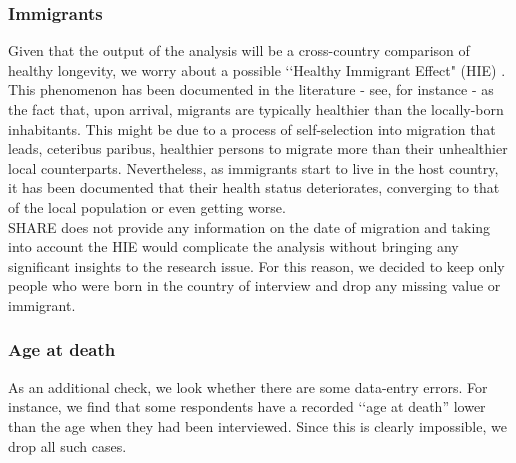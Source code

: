 \subsubsection{Immigrants}
Given that the output of the analysis will be a cross-country comparison of healthy longevity, we worry about a possible \lq\lq Healthy Immigrant Effect" (HIE) . This phenomenon has been documented in the literature - see, for instance \cite{Deri2004UnderstandingCanada, Kennedy2006TheCountries} - as the fact that, upon  arrival, migrants are typically healthier than the locally-born inhabitants. This might be due to a process of self-selection into migration that leads, ceteribus paribus, healthier persons to migrate more than their unhealthier local counterparts. Nevertheless, as immigrants start to live in the host country, it has been documented that their health status deteriorates, converging to that of the local population or even getting worse.\\
SHARE does not provide any information on the date of migration and taking into account the HIE would complicate the analysis without bringing any significant insights to the research issue. For this reason, we decided to keep only people who were born in the country of interview and drop any missing value or immigrant.


\subsubsection{Age at death}
As an additional check, we look whether there are some data-entry errors. For instance, we find that some respondents have a recorded \lq\lq age at death'' lower than the age when they had been interviewed. Since this is clearly impossible, we drop all such cases.





